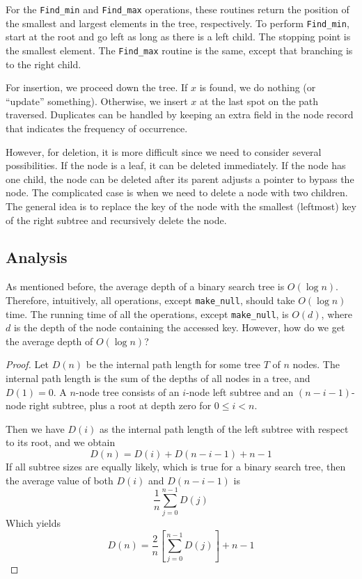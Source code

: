For the \verb|Find_min| and \verb|Find_max| operations, these routines return the position of the smallest and largest elements in the tree, respectively. To perform \verb|Find_min|, start at the root and go left as long as there is a left child. The stopping point is the smallest element. The \verb|Find_max| routine is the same, except that branching is to the right child.

For insertion, we proceed down the tree. If \(x\) is found, we do nothing (or ``update'' something). Otherwise, we insert \(x\) at the last spot on the path traversed. Duplicates can be handled by keeping an extra field in the node record that indicates the frequency of occurrence.

However, for deletion, it is more difficult since we need to consider several possibilities. If the node is a leaf, it can be deleted immediately. If the node has one child, the node can be deleted after its parent adjusts a pointer to bypass the node. The complicated case is when we need to delete a node with two children. The general idea is to replace the key of the node with the smallest (leftmost) key of the right subtree and recursively delete the node.

\subsection{Analysis}
As mentioned before, the average depth of a binary search tree is \(O(\log n)\). Therefore, intuitively, all operations, except \verb|make_null|, should take \(O(\log n)\) time. The running time of all the operations, except \verb|make_null|, is \(O(d)\), where \(d\) is the depth of the node containing the accessed key. However, how do we get the average depth of \(O(\log n)\)?

\begin{proof}
  Let \(D(n)\) be the internal path length for some tree \(T\) of \(n\) nodes. The internal path length is the sum of the depths of all nodes in a tree, and \(D(1) = 0\). A \(n\)-node tree consists of an \(i\)-node left subtree and an \((n - i - 1)\)-node right subtree, plus a root at depth zero for \(0 \leq i < n\).

  Then we have \(D(i)\) as the internal path length of the left subtree with respect to its root, and we obtain
  \[
    D(n) = D(i) + D(n - i - 1) + n - 1
  \]
  If all subtree sizes are equally likely, which is true for a binary search tree, then the average value of both \(D(i)\) and \(D(n - i - 1)\) is
  \[
    \dfrac{1}{n} \sum_{j = 0}^{n - 1} D(j)
  \]
  Which yields
  \[
    D(n) = \dfrac{2}{n} \left[\sum_{j = 0}^{n - 1} D(j)\right] + n - 1
  \]
\end{proof}

